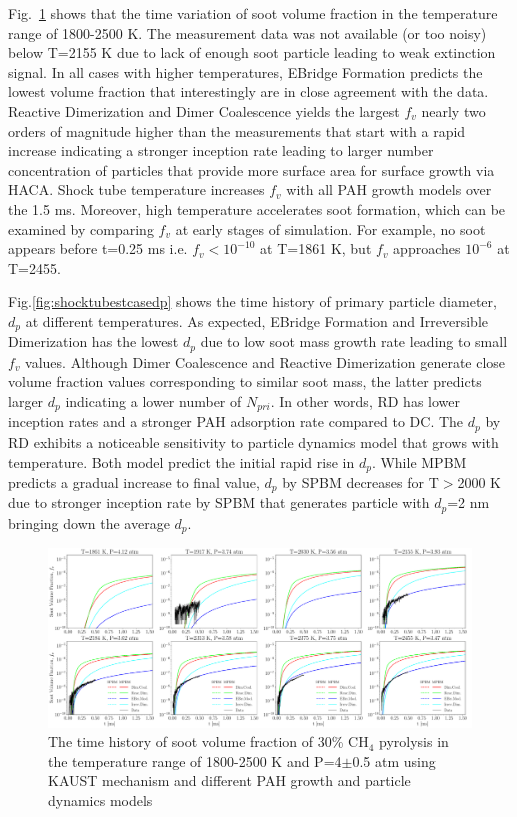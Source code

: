 Fig.~\ref{fig:shocktubestcasevf} shows that the time variation of soot volume fraction in the temperature range of 1800-2500 K. The measurement data was not available (or too noisy) below T=2155 K due to lack of enough soot particle leading to weak extinction signal. In all cases with higher temperatures, EBridge Formation predicts the lowest volume fraction that interestingly are in close agreement with the data. Reactive Dimerization and Dimer Coalescence yields the largest $f_v$ nearly two orders of magnitude higher than the measurements that start with a rapid increase indicating a stronger inception rate leading to larger number concentration of particles that provide more surface area for surface growth via HACA. Shock tube temperature increases $f_v$ with all PAH growth models over the 1.5 ms. Moreover, high temperature accelerates soot formation, which can be examined by comparing $f_v$ at early stages of simulation. For example, no soot appears before t=0.25 ms i.e. $f_v<10^{-10}$ at T=1861 K, but $f_v$ approaches $10^{-6}$ at T=2455.

Fig.\ref{fig:shocktubestcasedp} shows the time history of primary particle diameter, $d_p$ at different temperatures. As expected, EBridge Formation and Irreversible Dimerization has the lowest $d_p$ due to low soot mass growth rate leading to small $f_v$ values. Although Dimer Coalescence and Reactive Dimerization generate close volume fraction values corresponding to similar soot mass, the latter predicts larger $d_p$ indicating a lower number of $N_{pri}$. In other words, RD has lower inception rates and a stronger PAH adsorption rate compared to DC. The $d_p$ by RD exhibits a noticeable sensitivity to particle dynamics model that grows with temperature. Both model predict the initial rapid rise in $d_p$. While MPBM predicts a gradual increase to final value, $d_p$ by SPBM decreases for T$>$2000 K due to stronger inception rate by SPBM that generates particle with $d_p$=2 nm bringing down the average $d_p$.


\begin{figure}[H]
	\centering
	\includegraphics[width=1\textwidth]{Figures/Results/Shocktube/Stanford/june/stsh_cases_vf.pdf}
	\caption{The time history of soot volume fraction of 30\% $\mathrm{CH_4}$ pyrolysis in the temperature range of 1800-2500 K and P=4$\pm$0.5 atm using KAUST mechanism and different PAH growth and particle dynamics models}
	\label{fig:shocktubestcasevf} 
\end{figure}


